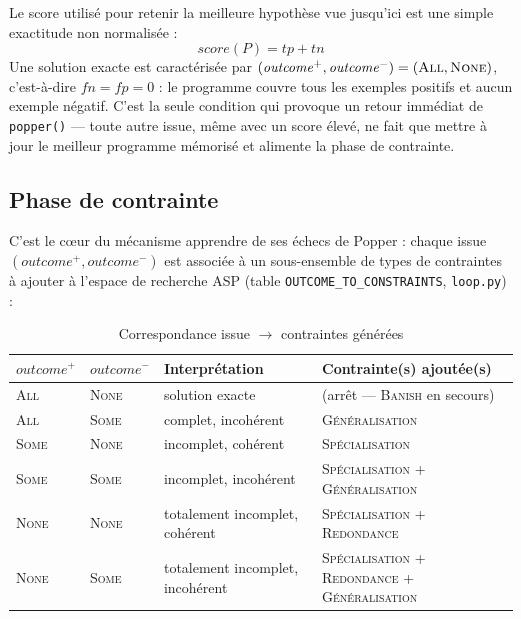 Le score utilisé pour retenir la \og meilleure hypothèse vue jusqu'ici \fg{}
est une simple exactitude non normalisée :
\[
  \mathit{score}(P) = \mathit{tp} + \mathit{tn}
\]
Une solution exacte est caractérisée par
$(\mathit{outcome}^+, \mathit{outcome}^-) = (\textsc{All}, \textsc{None})$,
c'est-à-dire $\mathit{fn} = \mathit{fp} = 0$ : le programme couvre tous
les exemples positifs et aucun exemple négatif. C'est la seule condition
qui provoque un retour immédiat de \texttt{popper()} --- toute autre
issue, même avec un score élevé, ne fait que mettre à jour le meilleur
programme mémorisé et alimente la phase de contrainte.

\subsection{Phase de contrainte}
\label{sec:popper-constrain}

C'est le cœur du mécanisme \og apprendre de ses échecs \fg{} de Popper :
chaque issue $(\mathit{outcome}^+, \mathit{outcome}^-)$ est associée à
un sous-ensemble de types de contraintes à ajouter à l'espace de
recherche ASP (table \texttt{OUTCOME\_TO\_CONSTRAINTS}, \texttt{loop.py}) :

\begin{table}[H]
\centering
\caption{Correspondance issue $\to$ contraintes générées}
\label{tab:outcome-constraints}
\begin{tabular}{@{}llll@{}}
\toprule
$\mathit{outcome}^+$ & $\mathit{outcome}^-$ & Interprétation & Contrainte(s) ajoutée(s) \\
\midrule
\textsc{All}  & \textsc{None} & solution exacte & (arrêt --- \textsc{Banish} en secours) \\
\textsc{All}  & \textsc{Some} & complet, incohérent & \textsc{Généralisation} \\
\textsc{Some} & \textsc{None} & incomplet, cohérent & \textsc{Spécialisation} \\
\textsc{Some} & \textsc{Some} & incomplet, incohérent & \textsc{Spécialisation} + \textsc{Généralisation} \\
\textsc{None} & \textsc{None} & totalement incomplet, cohérent & \textsc{Spécialisation} + \textsc{Redondance} \\
\textsc{None} & \textsc{Some} & totalement incomplet, incohérent & \textsc{Spécialisation} + \textsc{Redondance} + \textsc{Généralisation} \\
\bottomrule
\end{tabular}
\end{table}


